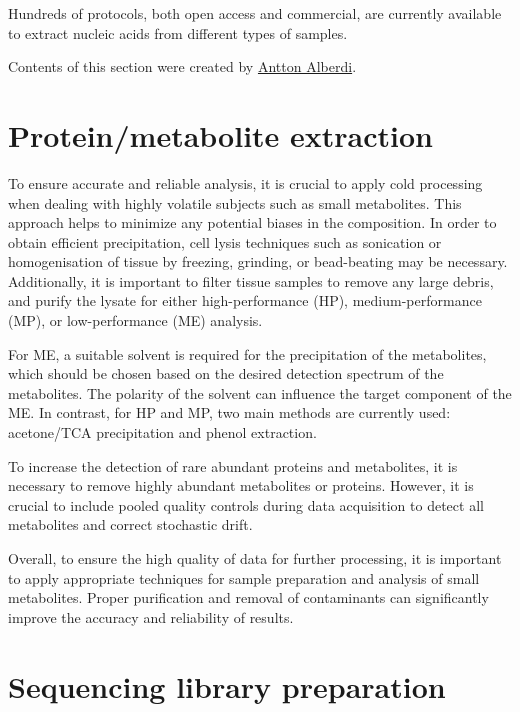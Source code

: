 \documentclass[
]{book}
\begin{document}
Hundreds of protocols, both open access and commercial, are currently available to extract nucleic acids from different types of samples.

Contents of this section were created by \protect\hyperlink{antton-alberdi}{Antton Alberdi}.

\hypertarget{protein-metabolite-extraction}{%
\chapter{Protein/metabolite extraction}\label{protein-metabolite-extraction}}

To ensure accurate and reliable analysis, it is crucial to apply cold processing when dealing with highly volatile subjects such as small metabolites. This approach helps to minimize any potential biases in the composition. In order to obtain efficient precipitation, cell lysis techniques such as sonication or homogenisation of tissue by freezing, grinding, or bead-beating may be necessary. Additionally, it is important to filter tissue samples to remove any large debris, and purify the lysate for either high-performance (HP), medium-performance (MP), or low-performance (ME) analysis.

For ME, a suitable solvent is required for the precipitation of the metabolites, which should be chosen based on the desired detection spectrum of the metabolites. The polarity of the solvent can influence the target component of the ME. In contrast, for HP and MP, two main methods are currently used: acetone/TCA precipitation and phenol extraction.

To increase the detection of rare abundant proteins and metabolites, it is necessary to remove highly abundant metabolites or proteins. However, it is crucial to include pooled quality controls during data acquisition to detect all metabolites and correct stochastic drift.

Overall, to ensure the high quality of data for further processing, it is important to apply appropriate techniques for sample preparation and analysis of small metabolites. Proper purification and removal of contaminants can significantly improve the accuracy and reliability of results.

\hypertarget{sequencing-library-preparation}{%
\chapter{Sequencing library preparation}\label{sequencing-library-preparation}}
\end{document}
